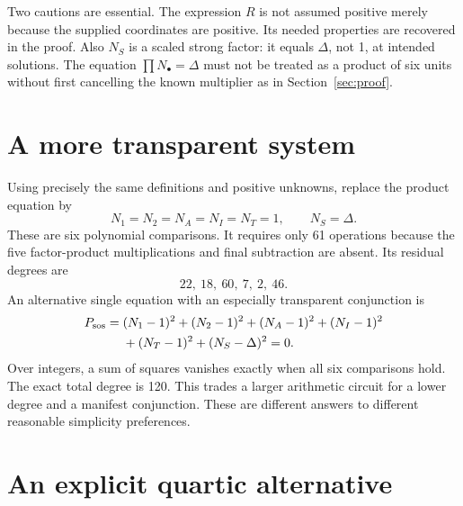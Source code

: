 \documentclass[11pt]{article}
\begin{document}
Two cautions are essential. The expression \(R\) is not assumed positive merely because the supplied coordinates are positive. Its needed properties are recovered in the proof. Also \(N_S\) is a scaled strong factor: it equals \(\Delta\), not 1, at intended solutions. The equation \(\prod N_\bullet=\Delta\) must not be treated as a product of six units without first cancelling the known multiplier as in Section~\ref{sec:proof}.

\section{A more transparent system}\label{sec:system}

Using precisely the same definitions and positive unknowns, replace the product equation by
\begin{equation}\label{eq:system}
\boxed{\qquad
 N_1=N_2=N_A=N_I=N_T=1,\qquad N_S=\Delta.
\qquad}
\end{equation}
These are six polynomial comparisons. It requires only 61 operations because the five factor-product multiplications and final subtraction are absent. Its residual degrees are
\[
22,\ 18,\ 60,\ 7,\ 2,\ 46.
\]
An alternative single equation with an especially transparent conjunction is
\begin{align}\label{eq:sos}
 P_{\rm sos}={}&(N_1-1)^2+(N_2-1)^2+(N_A-1)^2+(N_I-1)^2\notag\\
 &+(N_T-1)^2+(N_S-\Delta)^2=0.
\end{align}
Over integers, a sum of squares vanishes exactly when all six comparisons hold. The exact total degree is 120. This trades a larger arithmetic circuit for a lower degree and a manifest conjunction. These are different answers to different reasonable simplicity preferences.

\section{An explicit quartic alternative}\label{sec:quartic}
\end{document}
